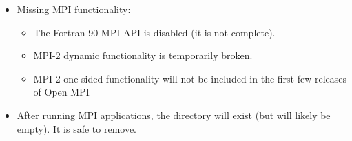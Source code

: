 \begin{itemize}
\item Missing MPI functionality:
  \begin{itemize}
  \item The Fortran 90 MPI API is disabled (it is not complete).
  \item MPI-2 dynamic functionality is temporarily broken.
  \item MPI-2 one-sided functionality will not be included in the
    first few releases of Open MPI
  \end{itemize}
  
\item After running MPI applications, the directory
   will exist (but
  will likely be empty).  It is safe to remove.

\end{itemize}


